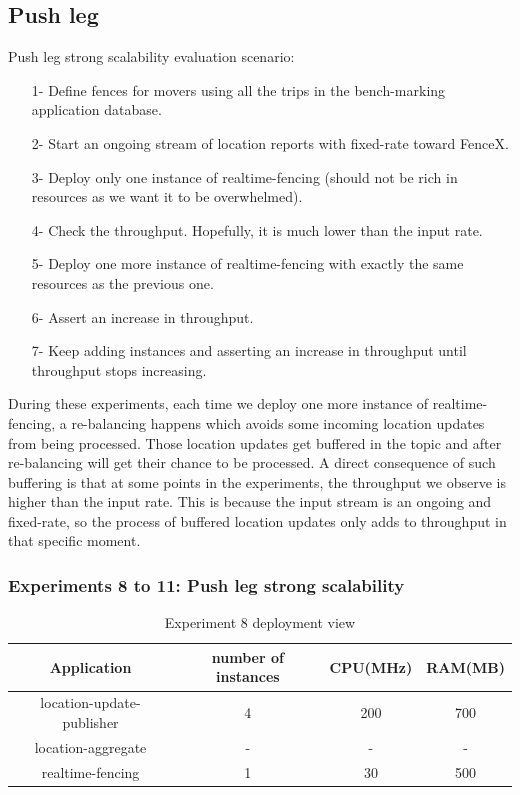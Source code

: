 \documentclass[a4]{report}
\begin{document}
    \subsection{Push leg}
    Push leg strong scalability evaluation scenario:
    \begin{itemize}
        \item[1-] Define fences for movers using all the trips in the bench-marking application database.
        \item[2-] Start an ongoing stream of location reports with fixed-rate toward FenceX.
        \item[3-] Deploy only one instance of realtime-fencing (should not be rich in resources as we want it to be overwhelmed).
        \item[4-] Check the throughput.
        Hopefully, it is much lower than the input rate.
        \item[5-] Deploy one more instance of realtime-fencing with exactly the same resources as the previous one.
        \item[6-] Assert an increase in throughput.
        \item[7-] Keep adding instances and asserting an increase in throughput until throughput stops increasing.
    \end{itemize}

    During these experiments, each time we deploy one more instance of realtime-fencing, a re-balancing happens which
    avoids some incoming location updates from being processed.
    Those location updates get buffered in the topic and after re-balancing will get their chance to be processed.
    A direct consequence of such buffering is that at some points in the experiments, the throughput we observe is higher than the input rate.
    This is because the input stream is an ongoing and fixed-rate, so the process of buffered location updates only adds to
    throughput in that specific moment.

    \subsubsection{Experiments 8 to 11: Push leg strong scalability}
    \begin{table}[h!]
        \centering
        \begin{tabular}{|c|c|c|c|}
            \hline
            Application               & number of instances & CPU(MHz) & RAM(MB) \\
            \hline
            location-update-publisher & 4                   & 200      & 700     \\
            location-aggregate        & -                   & -        & -       \\
            realtime-fencing          & 1                   & 30       & 500     \\
            \hline
        \end{tabular}
        \caption{Experiment 8 deployment view}
        \label{table:ex8-dv}
    \end{table}
\end{document}

